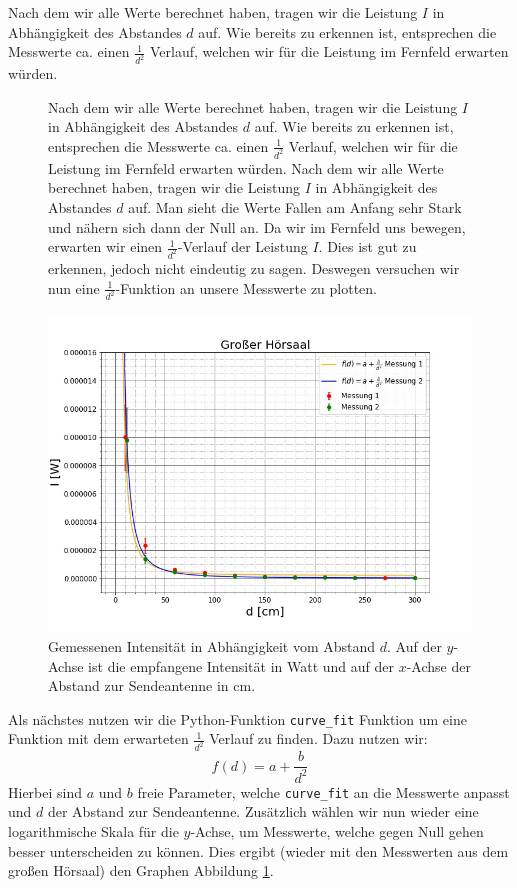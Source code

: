 \documentclass[titlepage,11pt,a4paper,ngerman]{article}
\begin{document}
Nach dem wir alle Werte berechnet haben, tragen wir die Leistung $I$ in Abhängigkeit des Abstandes $d$ auf. Wie bereits zu erkennen ist, entsprechen die Messwerte ca. einen $\frac{1}{d^{2}}$ Verlauf, welchen wir für die Leistung im Fernfeld erwarten würden.
\begin{figure}[ht]
\begin{minipage}{0.35\linewidth}
	Nach dem wir alle Werte berechnet haben, tragen wir die Leistung $I$ in Abhängigkeit des Abstandes $d$ auf. Wie bereits zu erkennen ist, entsprechen die Messwerte ca. einen $\frac{1}{d^{2}}$ Verlauf, welchen wir für die Leistung im Fernfeld erwarten würden. Nach dem wir alle Werte berechnet haben, tragen wir die Leistung $I$ in Abhängigkeit des Abstandes $d$ auf. Man sieht die Werte Fallen am Anfang sehr Stark und nähern sich dann der Null an. Da wir im Fernfeld uns bewegen, erwarten wir einen $\frac{1}{d^{2}}$-Verlauf der Leistung $I$. Dies ist gut zu erkennen, jedoch nicht eindeutig zu sagen. Deswegen versuchen wir nun eine $\frac{1}{d^{2}}$-Funktion an unsere Messwerte zu plotten.
\end{minipage}
\begin{minipage}{0.6 \linewidth}
	\includegraphics[scale=0.5]{Bilder/bsp}
	\centering
	\caption{Gemessenen Intensität in Abhängigkeit vom Abstand $d$. Auf der $y$-Achse ist die empfangene Intensität in Watt und auf der $x$-Achse der Abstand zur Sendeantenne in cm.}
	\label{Abstand-bsp}
\end{minipage}
\end{figure}



\FloatBarrier
\noindent
Als nächstes nutzen wir die Python-Funktion \verb|curve_fit| \cite{curvescipy} Funktion um eine Funktion mit dem erwarteten $\frac{1}{d^{2}}$ Verlauf zu finden. Dazu nutzen wir:
\begin{equation}
f(d) = a + \frac{b}{d^{2}}
\label{f}
\end{equation}	
Hierbei sind $a$ und $b$ freie Parameter, welche \verb|curve_fit| an die Messwerte anpasst und $d$ der Abstand zur Sendeantenne. Zusätzlich wählen wir nun wieder eine logarithmische Skala für die $y$-Achse, um Messwerte, welche gegen Null gehen besser unterscheiden zu können. Dies ergibt (wieder mit den Messwerten aus dem großen Hörsaal) den Graphen Abbildung \ref{Abstand-bsp}.
\end{document}
